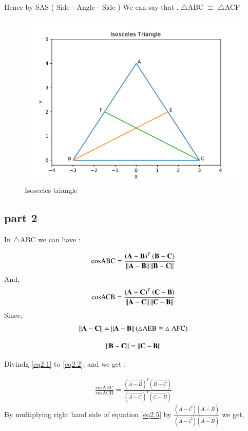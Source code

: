 \documentclass[journal,12pt,twocolumn]{IEEEtran}
\begin{document}
 
  Hence by SAS ( Side - Angle - Side ) We can say that , $\triangle$ABC $\cong$ $\triangle$ACF  
  
  
  
  
  \begin{figure}[htb!]	
  	\centering	
  	\includegraphics[width=.50\textwidth, height=.30\textheight]{Figure_1.pdf}	
  	\caption{Isosceles triangle}
  	\label{fig1}	
  \end{figure}
  
 \subsection{part 2} 
  In $\triangle$ABC we can have :

\begin{align}
 \text{cosABC} = \frac{\left( \mathbf{A-B} \right)^T  \left( \mathbf{B - C } \right)}{\left\lVert\mathbf{A - B}\right\rVert \left\lVert\mathbf{B - C}\right\rVert} \label{eq2.1}
\end{align}
And,
\begin{align}
 \text{cosACB} = \frac{\left( \mathbf{A-C} \right)^T  \left( \mathbf{C - B } \right)}{\left\lVert\mathbf{A - C}\right\rVert \left\lVert\mathbf{C - B}\right\rVert} \label{eq2.2}
\end{align}
  Since,
   \begin{align}
  \left\lVert \mathbf{A - C}\right\rVert =  \left\lVert\mathbf{A - B}\right\rVert  \left(  \triangle \text{AEB} \cong \triangle \text{ AFC}  \right) \label{eq2.3}
  \end{align}
 
   \begin{align}
  \left\lVert \mathbf{B - C}\right\rVert =  \left\lVert\mathbf{C - B}\right\rVert  \label{eq2.4}
  \end{align}
  
 Divindg \ref{eq2.1} to \ref{eq2.2}, and we get :
 
 \begin{align}
 \frac{\text{cosABC}}{\text{cosACB}} = \frac{\left( \vec{A-B} \right)^T  \left( \vec{B - C } \right)}{\left( \vec{A-C} \right)^T  \left( \vec{C - B } \right)} \label{eq2.5}
 \end{align}
 By multiplying right hand side of equation \ref{eq2.5} by $\frac{\left( \vec{A-C} \right) \left( \vec{A - B } \right)}{\left( \vec{A-C} \right)  \left( \vec{A - B } \right)}$ we get,
 
\end{document}
